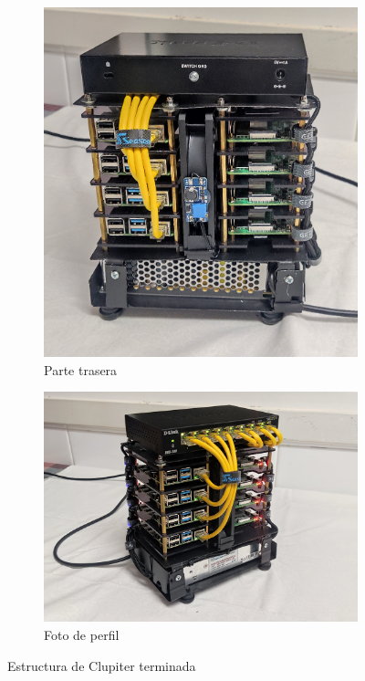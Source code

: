\begin{itemize}
\begin{figure}[h!]
\begin{subfigure}[c]{0.4\textwidth}
        \includegraphics[width=\textwidth]{img/fotos_estructura/back.jpg}
        \caption{Parte trasera}
        \label{fig:fotos_estructura_back}
    \end{subfigure}

    \begin{subfigure}[c]{0.7\textwidth}
        \includegraphics[width=\textwidth]{img/fotos_estructura/style.jpg}
        \caption{Foto de perfil}
        \label{fig:fotos_estructura_style}
    \end{subfigure}
    \caption{Estructura de Clupiter terminada}
    \label{fig:fotos_estructura}
    \end{figure}


\end{itemize}
